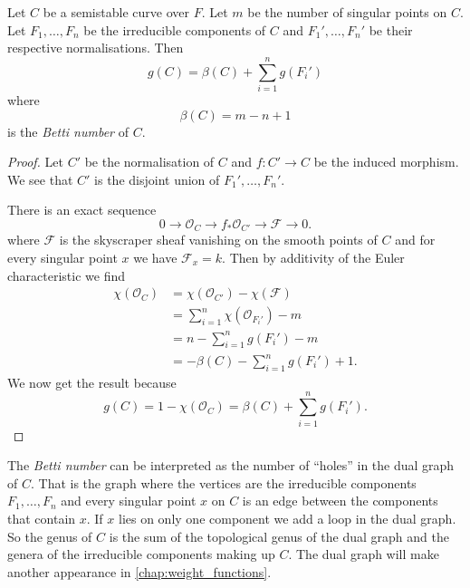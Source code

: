 \begin{lemma}\label{lem:genus_semi_stable_curve}
	Let $C$ be a semistable curve over $F$. 
	Let $m$ be the number of singular points on $C$. 
	Let $F_1, \ldots, F_n$ be the irreducible components of $C$ and $F_1', \ldots, F_n'$ be their respective normalisations.
	Then \[
		g(C) = \beta(C) + \sum_{i = 1}^{n} g(F_i')
	\] 
	where \[
		\beta(C) = m - n + 1
	\]
	is the \emph{Betti number} of $C$. 
\end{lemma}
\begin{proof}
	Let $C'$ be the normalisation of $C$ and $f: C' \to C$ be the induced morphism. 
	We see that  $C'$ is the disjoint union of $F_1', \ldots, F_n'$. 

	There is  an exact sequence \[
	0 \to \mathcal{O}_C \to f_* \mathcal{O}_{C'} \to \mathcal{F} \to 0 
	.\] 
	where $\mathcal{F} $ is the skyscraper sheaf vanishing on the smooth points of $C$ and for every singular point $x$ we have $\mathcal{F} _x = k$.  
	Then by additivity of the Euler characteristic we find
	\begin{align*}
		\chi(\mathcal O_C) &= \chi(\mathcal O_{C'}) - \chi(\mathcal F) \\
				   &= \sum_{i = 1}^{n} \chi(\mathcal O_{F_i'}) - m\\
				   &= n -  \sum_{i = 1}^{n} g(F_i') - m\\
				   &= -\beta(C) - \sum_{i = 1}^{n} g(F_i') + 1 
	.\end{align*}
	We now get the result because \[
		g(C) = 1 - \chi(\mathcal{O}_C) = \beta(C) + \sum_{i = 1}^{n} g(F_i')  
	.\] 
\end{proof}
\begin{remark}\label{rem:genus_semi_stable_curve}
	The \emph{Betti number} can be interpreted as the number of ``holes'' in the dual graph of $C$. 
	That is the graph where the vertices are the irreducible components $F_1, \ldots, F_n$ and every singular point $x$ on $C$ is an edge between the components that contain $x$.
	If $x$ lies on only one component we add a loop in the dual graph.
	So the genus of $C$ is the sum of the topological genus of the dual graph and the genera of the irreducible components making up $C$.
	The dual graph will make another appearance in \cref{chap:weight_functions}. 
\end{remark}

